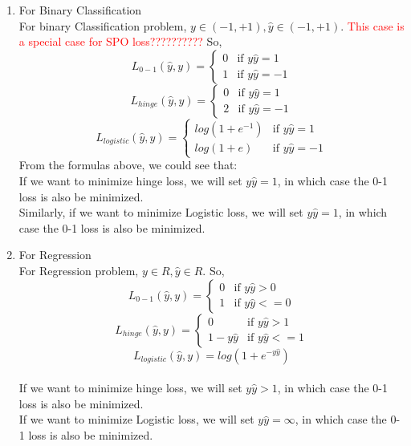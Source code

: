 \documentclass[11pt]{article}
\begin{document}
\begin{enumerate}
    \begin{enumerate}
        \item For Binary Classification
        \\
        For binary Classification problem, $y\in (-1,+1),  \hat{y}\in (-1,+1)$. \textcolor{red}{This case is a special case for SPO loss??????????} So,
        \[L_{0-1}(\hat{y}, y) = \begin{cases} 
        0 &\mbox{if } y\hat{y} = 1 \\
        1 & \mbox{if } y\hat{y} = -1 \end{cases}\]
        \[L_{hinge}(\hat{y}, y) = \begin{cases} 
        0 &\mbox{if } y\hat{y} = 1 \\
        2 & \mbox{if } y\hat{y} = -1 \end{cases}\]
        \[L_{logistic}(\hat{y}, y) = \begin{cases} 
        log(1+e^{-1}) &\mbox{if } y\hat{y} = 1 \\
        log(1+e) & \mbox{if } y\hat{y} = -1 \end{cases}\]
        From the formulas above, we could see that:
        \\If we want to minimize hinge loss, we will set $y\hat{y} = 1$, in which case the 0-1 loss is also be minimized. 
        \\Similarly, if we want to minimize Logistic loss, we will set $y\hat{y} = 1$, in which case the 0-1 loss is also be minimized. 
        \item For Regression
        \\
        For Regression problem,  $y\in R,  \hat{y}\in R $. So, \[L_{0-1}(\hat{y}, y) = \begin{cases} 
        0 &\mbox{if } y\hat{y} >0 \\
        1 & \mbox{if } y\hat{y} <=0 \end{cases}\]
        \[L_{hinge}(\hat{y}, y) = \begin{cases} 
        0 &\mbox{if } y\hat{y} >1 \\
        1-y\hat{y} & \mbox{if } y\hat{y} <=1 \end{cases}\]
        \[L_{logistic}(\hat{y}, y) = log(1+e^{-y\hat{y}})\]
        \\If we want to minimize hinge loss, we will set $y\hat{y} >1$, in which case the 0-1 loss is also be minimized. 
        \\If we want to minimize Logistic loss, we will set $y\hat{y} = \infty$, in which case the 0-1 loss is also be minimized. \\

\end{enumerate}
\end{enumerate}
\end{document}

